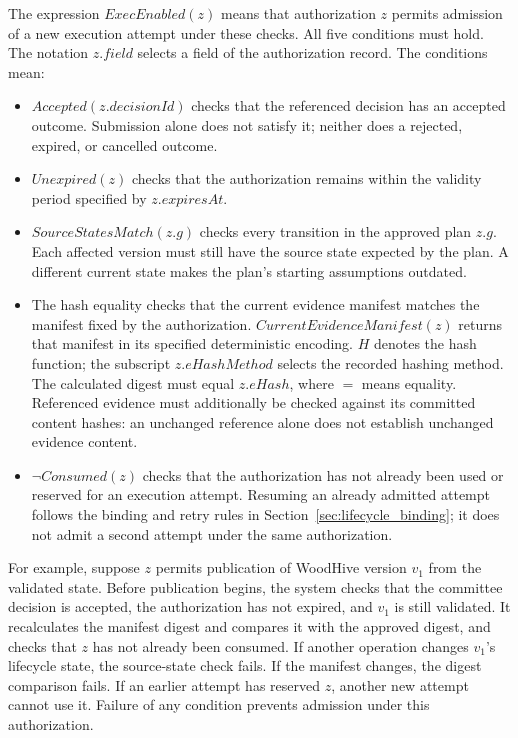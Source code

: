 \documentclass[journal]{IEEEtran}
\begin{document}
The expression $ExecEnabled(z)$ means that authorization $z$ permits
admission of a new execution attempt under these checks. All
five conditions must hold. The notation $z.field$ selects a field
of the authorization record. The conditions mean:
\begin{itemize}
    \item $Accepted(z.decisionId)$ checks that the referenced decision
    has an accepted outcome. Submission alone does not satisfy it;
    neither does a rejected, expired, or cancelled outcome.
    \item $Unexpired(z)$ checks that the authorization remains within
    the validity period specified by $z.expiresAt$.
    \item $SourceStatesMatch(z.g)$ checks every transition in the
    approved plan $z.g$. Each affected version must still have the
    source state expected by the plan. A different current state
    makes the plan's starting assumptions outdated.
    \item The hash equality checks that the current evidence manifest
    matches the manifest fixed by the authorization.
    $CurrentEvidenceManifest(z)$ returns that manifest in its specified
    deterministic encoding. $H$ denotes the hash function; the subscript
    $z.eHashMethod$ selects the recorded hashing method. The calculated
    digest must equal $z.eHash$, where $=$ means equality. Referenced
    evidence must additionally be checked against its committed content
    hashes: an unchanged reference alone does not establish unchanged
    evidence content.
    \item $\neg Consumed(z)$ checks that the authorization has not
    already been used or reserved for an execution attempt. Resuming an already admitted attempt follows
    the binding and retry rules in Section~\ref{sec:lifecycle_binding};
    it does not admit a second attempt under the same authorization.
\end{itemize}

For example, suppose $z$ permits publication of WoodHive version $v_1$
from the validated state. Before publication begins, the system checks
that the committee decision is accepted, the authorization has not
expired, and $v_1$ is still validated. It recalculates the manifest
digest and compares it with the approved digest, and checks that
$z$ has not already been consumed. If another operation changes
$v_1$'s lifecycle state, the source-state check fails. If the manifest
changes, the digest comparison fails. If an earlier attempt has
reserved $z$, another new attempt cannot use it. Failure of any
condition prevents admission under this authorization.
\end{document}
